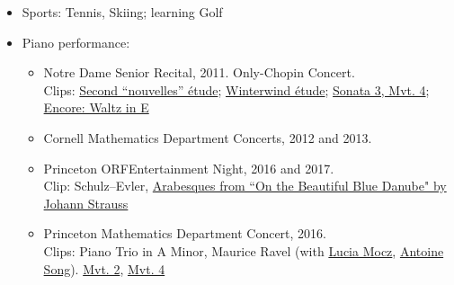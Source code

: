 \documentclass[letterpaper,11pt]{article}
\begin{document}
\begin{itemize}[noitemsep,nolistsep,label={}]
\item Sports: Tennis, Skiing; learning Golf
\item Piano performance:
\begin{itemize}


\item Notre Dame Senior Recital, 2011. Only-Chopin Concert. 
\\ Clips: \href{https://www.facebook.com/mark.cerenzia.90/videos/vb.35108657/10100397230349342/?type=3}{Second ``nouvelles'' \'{e}tude}; \href{https://www.facebook.com/mark.cerenzia.90/videos/vb.35108657/10100397251901152/?type=3}{Winterwind \'{e}tude}; \href{https://www.facebook.com/mark.cerenzia.90/videos/vb.35108657/10100397305089562/?type=3}{Sonata 3, Mvt. 4}; \href{https://www.facebook.com/mark.cerenzia.90/videos/vb.35108657/10100397330358922/?type=3}{Encore: Waltz in E}

\item Cornell Mathematics Department Concerts, 2012 and 2013.

\item Princeton ORFEntertainment Night, 2016 and 2017. \\ Clip: Schulz--Evler, \href{https://www.youtube.com/watch?v=pOAiON-sooA&index=2&list=PLwpFe8W22NfXC8-t3SJXgK-XChBY9vOAQ}{Arabesques from ``On the Beautiful Blue Danube" by Johann Strauss}
\item Princeton Mathematics Department Concert, 2016. \\
Clips: Piano Trio in A Minor, Maurice Ravel (with \href{https://www.math.princeton.edu/directory/lucia-mocz}{Lucia Mocz}, \href{https://www.math.princeton.edu/directory/antoine-song}{Antoine Song}). \href{https://www.facebook.com/mark.cerenzia.90/videos/vb.35108657/10100854009195872/?type=3}{Mvt. 2}, \href{https://www.facebook.com/mark.cerenzia.90/videos/vb.35108657/10100855055808452/?type=3}{Mvt. 4}
\end{itemize}
\end{itemize}
\end{document}

